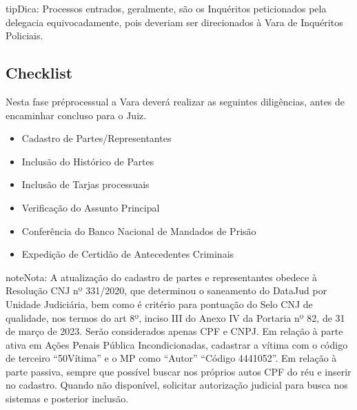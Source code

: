 \documentclass[letterpaper,10pt,brazil]{sphinxmanual}
\begin{document}
\begin{sphinxadmonition}{tip}{Dica:}
\sphinxAtStartPar
Processos entrados, geralmente, são os Inquéritos peticionados pela delegacia equivocadamente, pois deveriam ser direcionados à Vara de Inquéritos Policiais.
\end{sphinxadmonition}


\subsection{Checklist}
\label{\detokenize{01processos_entrados:checklist}}
\sphinxAtStartPar
Nesta fase pré\sphinxhyphen{}processual a Vara deverá realizar as seguintes diligências, antes de encaminhar concluso para o Juiz.
\begin{itemize}
\item {} 
\sphinxAtStartPar
Cadastro de Partes/Representantes

\item {} 
\sphinxAtStartPar
Inclusão do Histórico de Partes

\item {} 
\sphinxAtStartPar
Inclusão de Tarjas processuais

\item {} 
\sphinxAtStartPar
Verificação do Assunto Principal

\item {} 
\sphinxAtStartPar
Conferência do Banco Nacional de Mandados de Prisão

\item {} 
\sphinxAtStartPar
Expedição de Certidão de Antecedentes Criminais

\end{itemize}

\begin{sphinxadmonition}{note}{Nota:}
\sphinxAtStartPar
A atualização do cadastro de partes e representantes obedece à Resolução CNJ nº 331/2020, que determinou o saneamento do DataJud por Unidade Judiciária, bem como é critério para pontuação do Selo CNJ de qualidade, nos termos do art 8º, inciso III do Anexo IV da Portaria nº 82, de 31 de março de 2023. Serão considerados apenas CPF e CNPJ. Em relação à parte ativa em Ações Penais Pública Incondicionadas, cadastrar a vítima com o código de terceiro “50\sphinxhyphen{}Vítima” e o MP como “Autor” “Código 4441052”. Em relação à parte passiva, sempre que possível buscar nos próprios autos CPF do réu e inserir no cadastro. Quando não disponível, solicitar autorização judicial para busca nos sistemas e posterior inclusão.
\end{sphinxadmonition}
\end{document}
